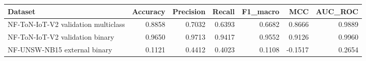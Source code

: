 \begin{tabular}{lrrrrrr}
\toprule
Dataset & Accuracy & Precision & Recall & F1_macro & MCC & AUC_ROC \\
\midrule
NF-ToN-IoT-V2 validation multiclass & 0.8858 & 0.7032 & 0.6393 & 0.6682 & 0.8666 & 0.9889 \\
NF-ToN-IoT-V2 validation binary & 0.9650 & 0.9713 & 0.9417 & 0.9552 & 0.9126 & 0.9960 \\
NF-UNSW-NB15 external binary & 0.1121 & 0.4412 & 0.4023 & 0.1108 & -0.1517 & 0.2654 \\
\bottomrule
\end{tabular}
